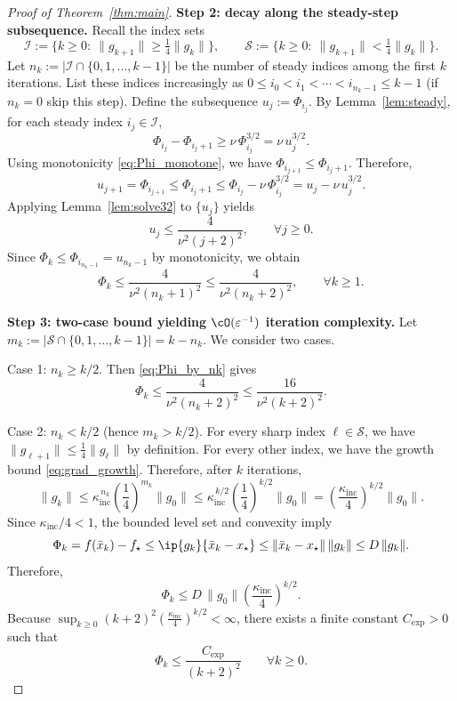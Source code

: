 \documentclass[review,onefignum,onetabnum]{siamart171218}
\begin{document}
\begin{proof}[Proof of Theorem~\ref{thm:main}]
		\smallskip
		\noindent\textbf{Step 2: decay along the steady-step subsequence.}
		Recall the index sets
		\[
		\mathcal I:=\{k\ge 0:\ \|g_{k+1}\|\ge \tfrac14\|g_k\|\},
		\qquad
		\mathcal S:=\{k\ge 0:\ \|g_{k+1}\|< \tfrac14\|g_k\|\}.
		\]
		Let $n_k:=|\mathcal I\cap\{0,1,\dots,k-1\}|$ be the number of steady indices among the first $k$ iterations.
		List these indices increasingly as $0\le i_0<i_1<\cdots<i_{n_k-1}\le k-1$ (if $n_k=0$ skip this step).
		Define the subsequence $u_j:=\Phi_{i_j}$.
		By Lemma~\ref{lem:steady}, for each steady index $i_j\in\mathcal I$,
		\[
		\Phi_{i_j}-\Phi_{i_j+1}\ge \nu\,\Phi_{i_j}^{3/2}=\nu\,u_j^{3/2}.
		\]
		Using monotonicity \eqref{eq:Phi_monotone}, we have $\Phi_{i_{j+1}}\le \Phi_{i_j+1}$.
		Therefore,
		\[
		u_{j+1}=\Phi_{i_{j+1}}
		\le \Phi_{i_j+1}
		\le \Phi_{i_j}-\nu\,\Phi_{i_j}^{3/2}
		= u_j-\nu\,u_j^{3/2}.
		\]
		Applying Lemma~\ref{lem:solve32} to $\{u_j\}$ yields
		\begin{equation}\label{eq:u_bound}
			u_j\le \frac{4}{\nu^2(j+2)^2},\qquad \forall j\ge 0.
		\end{equation}
		Since $\Phi_k\le \Phi_{i_{n_k-1}}=u_{n_k-1}$ by monotonicity, we obtain
		\begin{equation}\label{eq:Phi_by_nk}
			\Phi_k\le \frac{4}{\nu^2(n_k+1)^2}\le \frac{4}{\nu^2(n_k+2)^2},
			\qquad \forall k\ge 1.
		\end{equation}
		
		\smallskip
		\noindent\textbf{Step 3: two-case bound yielding $\cO(\varepsilon^{-1})$ iteration complexity.}
		Let $m_k:=|\mathcal S\cap\{0,1,\dots,k-1\}|=k-n_k$.
		We consider two cases.
		
		Case 1: $n_k\ge k/2$.
		Then \eqref{eq:Phi_by_nk} gives
		\[
		\Phi_k\le \frac{4}{\nu^2(n_k+2)^2}\le \frac{16}{\nu^2(k+2)^2}.
		\]
		
		Case 2: $n_k< k/2$ (hence $m_k>k/2$).
		For every sharp index $\ell\in\mathcal S$, we have $\|g_{\ell+1}\|\le \frac14\|g_\ell\|$ by definition.
		For every other index, we have the growth bound \eqref{eq:grad_growth}.
		Therefore, after $k$ iterations,
		\[
		\|g_k\|
		\le \kappa_{\mathrm{inc}}^{\,n_k}\left(\frac14\right)^{m_k}\|g_0\|
		\le \kappa_{\mathrm{inc}}^{\,k/2}\left(\frac14\right)^{k/2}\|g_0\|
		=\left(\frac{\kappa_{\mathrm{inc}}}{4}\right)^{k/2}\|g_0\|.
		\]
		Since $\kappa_{\mathrm{inc}}/4<1$, the bounded level set and convexity imply
		\[
		\Phi_k=f(\bar x_k)-f_\star
		\le \ip{g_k}{\bar x_k-x_\star}
		\le \|\bar x_k-x_\star\|\,\|g_k\|
		\le D\,\|g_k\|.
		\]
		Therefore,
		\[
		\Phi_k\le D\,\|g_0\|\left(\frac{\kappa_{\mathrm{inc}}}{4}\right)^{k/2}.
		\]
		Because $\sup_{k\ge 0}(k+2)^2\left(\frac{\kappa_{\mathrm{inc}}}{4}\right)^{k/2}<\infty$, there exists a finite constant $C_{\exp}>0$ such that
		\[
		\Phi_k\le \frac{C_{\exp}}{(k+2)^2}\qquad\forall k\ge 0.
		\]
		

\end{proof}
\end{document}
